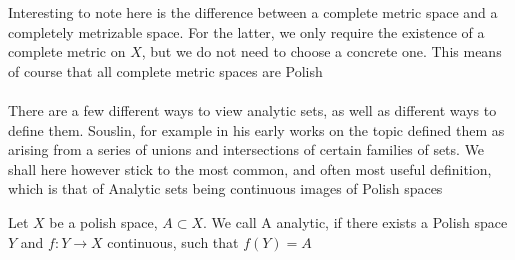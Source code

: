 \documentclass[10pt, a4paper, titlepage]{article}
\numberwithin{equation}{section}
\begin{document}
Interesting to note here is the difference between a complete metric space and a completely metrizable space.
For the latter, we only require the existence of a complete metric on $X$, but we do not need to choose a concrete one.
This means of course that all complete metric spaces are Polish\\
\\
There are a few different ways to view analytic sets, as well as different ways to define them. 
Souslin, for example in his early works on the topic defined them as arising from a series of unions and intersections of certain families of sets.
We shall here however stick to the most common, and often most useful  definition, which is that of Analytic sets being continuous images of Polish spaces 

\begin{definition}
	Let $X$ be a polish space, $A \subset X$. We call A analytic, if there exists a Polish space $Y$ and  $f:Y \to X$ continuous, such that  $f(Y) = A$

\end{definition}
\end{document}

